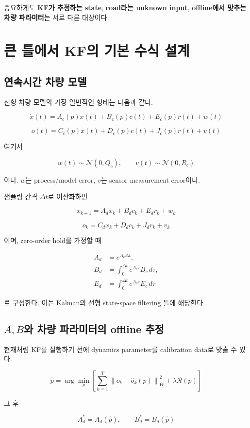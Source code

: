 \documentclass[letterpaper,10pt,journal,twocolumn]{ieeeconf}
\newcommand{\Normal}{\mathcal{N}}
\begin{document}
중요하게도 \textbf{KF가 추정하는 state}, \textbf{road라는 unknown input}, \textbf{offline에서 맞추는 차량 파라미터}는 서로 다른 대상이다.

\section{큰 틀에서 KF의 기본 수식 설계}

\subsection{연속시간 차량 모델}

선형 차량 모델의 가장 일반적인 형태는 다음과 같다.

\[
\dot x(t)
=
A_c(p)x(t)
+B_c(p)c(t)
+E_c(p)r(t)
+w(t)
\]

\[
o(t)
=
C_c(p)x(t)
+D_c(p)c(t)
+J_c(p)r(t)
+v(t)
\]

여기서

\[
w(t)\sim\Normal(0,Q_c),
\qquad
v(t)\sim\Normal(0,R_c)
\]

이다. \(w\)는 process/model error, \(v\)는 sensor measurement error이다.

샘플링 간격 \(\Delta t\)로 이산화하면

\[
x_{k+1}
=
A_dx_k+B_dc_k+E_dr_k+w_k
\]

\[
o_k
=
C_dx_k+D_dc_k+J_dr_k+v_k
\]

이며, zero-order hold를 가정할 때

\[
\begin{aligned}
A_d &= e^{A_c\Delta t},\\
B_d &= \int_0^{\Delta t}e^{A_c\tau}B_c\,d\tau,\\
E_d &= \int_0^{\Delta t}e^{A_c\tau}E_c\,d\tau
\end{aligned}
\]

로 구성한다. 이는 Kalman의 선형 state-space filtering 틀에 해당한다 \cite{kalman1960}.

\subsection{\(A,B\)와 차량 파라미터의 offline 추정}

현재처럼 KF를 실행하기 전에 dynamics parameter를 calibration data로 맞출 수 있다.

\[
\hat p
=
\arg\min_p
\left[
\sum_{k=1}^{T}
\left\|
o_k-\hat o_k(p)
\right\|_{W}^{2}
+\lambda\mathcal R(p)
\right]
\]

그 후

\[
A_d^{*}=A_d(\hat p),
\qquad
B_d^{*}=B_d(\hat p)
\]
\end{document}
